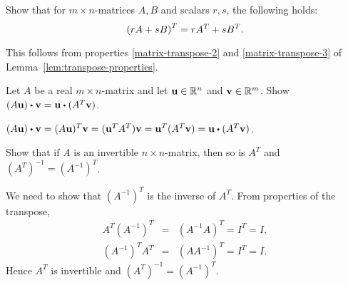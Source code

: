 \begin{enumialphparenastyle}
\begin{ex}
  Show that for $m \times n$-matrices $A,B$ and scalars $r, s$, the
  following holds:
  \begin{equation*}
    \left(rA + sB\right) ^T = rA^{T} + sB^{T}.
  \end{equation*}
  \vspace{-4ex}
  \begin{sol}
    This follows from properties {\ref{matrix-transpose-2}} and
    {\ref{matrix-transpose-3}} of
    Lemma~\ref{lem:transpose-properties}.
  \end{sol}
\end{ex}

\begin{ex} \label{exer-Rn3}  Let $A$ be a real $m\times n$-matrix and
  let $\mbox{\bf u}\in \mathbb{R}^{n}$ and $\mbox{\bf v}\in \mathbb{R}^{m}$. Show 
  $(A\vect{u})\dotprod \vect{v}=\vect{u}\dotprod (A^{T}\vect{v})$. 
  \begin{sol}
    $(A\vect{u})\dotprod \vect{v} = (A\vect{u})^T\vect{v} =
    (\vect{u}^TA^T)\vect{v}  = \vect{u}^T(A^T\vect{v}) =
    \vect{u}\dotprod (A^T\vect{v})$.
  \end{sol}
\end{ex}

\begin{ex}
  Show that if $A$ is an invertible $n\times n$-matrix, then so is
  $A^{T} $ and $(A^{T})^{-1}=(A^{-1})^{T}$.
  \begin{sol}
    We need to show that $(A^{-1})^{T}$ is the inverse of
    $A^{T}$. From properties of the transpose,
    \begin{eqnarray*}
      A^{T}(A^{-1})^{T} &=& (A^{-1}A)^{T}=I^{T}=I, \\
      (A^{-1})^{T}A^{T} &=& (AA^{-1})^{T}=I^{T}=I.
    \end{eqnarray*}
    Hence $A^{T}$ is invertible and $(A^{T})^{-1}=(A^{-1})^{T}$.
  \end{sol}
\end{ex}

\end{enumialphparenastyle}
